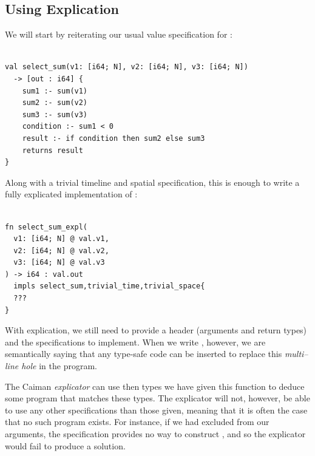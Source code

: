 \subsection{Using Explication}

We will start by reiterating our usual value specification for :
%
\begin{lstlisting}

val select_sum(v1: [i64; N], v2: [i64; N], v3: [i64; N]) 
  -> [out : i64] {
    sum1 :- sum(v1)
    sum2 :- sum(v2)
    sum3 :- sum(v3)
    condition :- sum1 < 0
    result :- if condition then sum2 else sum3
    returns result
}
\end{lstlisting}
%
Along with a trivial timeline and spatial specification, this is enough to write a fully explicated implementation of :
%
\begin{lstlisting}

fn select_sum_expl(
  v1: [i64; N] @ val.v1,
  v2: [i64; N] @ val.v2,
  v3: [i64; N] @ val.v3
) -> i64 : val.out 
  impls select_sum,trivial_time,trivial_space{
  ???
}
\end{lstlisting}
%
With explication, we still need to provide a header (arguments and return types) and the specifications to implement.  When we write , however, we are semantically saying that any type-safe code can be inserted to replace this \emph{multi--line hole} in the program.

The Caiman \emph{explicator} can use then types we have given this function to deduce some program that matches these types.  The explicator will not, however, be able to use any other specifications than those given, meaning that it is often the case that no such program exists.  For instance, if we had excluded  from our arguments, the  specification provides no way to construct , and so the explicator would fail to produce a solution.

